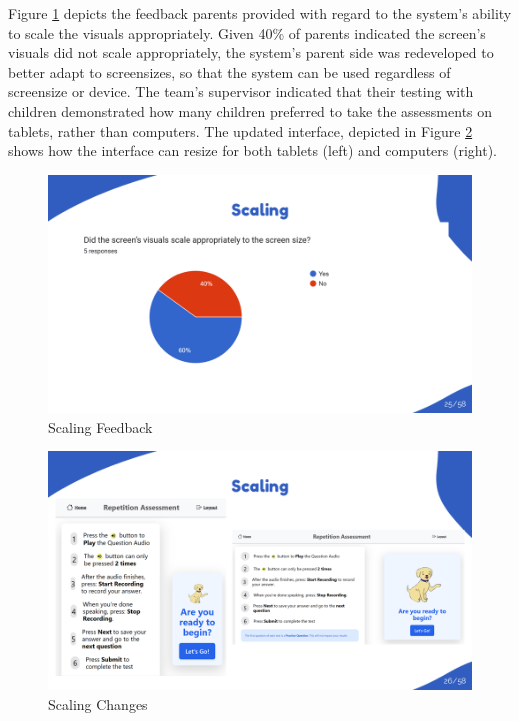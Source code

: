 \documentclass{article}
\begin{document}
Figure \ref{fig:parents_scaling_feedback} depicts the feedback parents provided with regard to the system's ability to scale the visuals appropriately.
Given 40\% of parents indicated the screen's visuals did not scale appropriately, the system's parent side was redeveloped to better adapt to screensizes, so that the system can be used regardless of screensize or device.
The team's supervisor indicated that their testing with children demonstrated how many children preferred to take the assessments on tablets, rather than computers. The updated interface, depicted in Figure \ref{fig:parents_scaling_changes}
shows how the interface can resize for both tablets (left) and computers (right).

\begin{figure}[H]
  \centering
  \includegraphics[width=\textwidth]{images/slide25.png}
  \caption{Scaling Feedback}
  \label{fig:parents_scaling_feedback}
\end{figure}

\begin{figure}[H]
  \centering
  \includegraphics[width=\textwidth]{images/slide26.png}
  \caption{Scaling Changes}
  \label{fig:parents_scaling_changes}
\end{figure}
\end{document}
